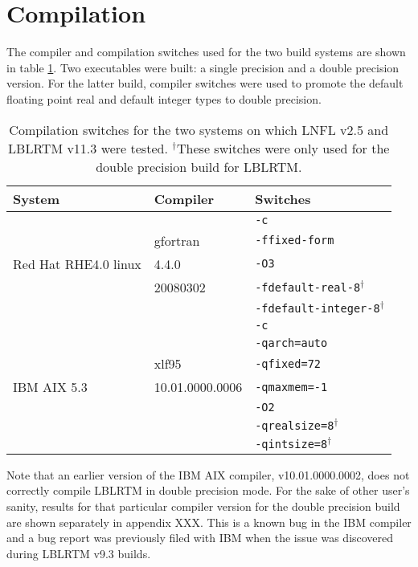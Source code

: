 \section{Compilation}
The compiler and compilation switches used for the two build systems are shown in table \ref{tab:lblrtm_compilation_switches}. Two executables were built: a single precision and a double precision version. For the latter build, compiler switches were used to promote the default floating point real and default integer types to double precision.

\begin{table}[htp]
  \centering
  \begin{tabular}{p{4cm} p{3cm} p{4cm}}
    \hline
    \sffamily\textbf{System} & \sffamily\textbf{Compiler} & \sffamily\textbf{Switches} \\
    \hline\hline
                         &          & \texttt{-c}\\
                         & gfortran & \texttt{-ffixed-form}\\
    Red Hat RHE4.0 linux & 4.4.0    & \texttt{-O3}\\
                         & 20080302 & \texttt{-fdefault-real-8}$^\dagger$\\
                         &          & \texttt{-fdefault-integer-8}$^\dagger$\\
    \hline
                         &                 & \texttt{-c}\\ 
                         &                 & \texttt{-qarch=auto}\\
                         & xlf95           & \texttt{-qfixed=72}\\
    IBM AIX 5.3          & 10.01.0000.0006 & \texttt{-qmaxmem=-1}\\
                         &                 & \texttt{-O2}\\
                         &                 & \texttt{-qrealsize=8}$^\dagger$\\
                         &                 & \texttt{-qintsize=8}$^\dagger$\\
    \hline
  \end{tabular}
  \caption{Compilation switches for the two systems on which LNFL v2.5 and LBLRTM v11.3 were tested. $^\dagger$These switches were only used for the double precision build for LBLRTM.}
  \label{tab:lblrtm_compilation_switches}
\end{table}

Note that an earlier version of the IBM AIX compiler, v10.01.0000.0002, does not correctly compile LBLRTM in double precision mode. For the sake of other user's sanity, results for that particular compiler version for the double precision build are shown separately in appendix XXX. This is a known bug in the IBM compiler and a bug report was previously filed with IBM when the issue was discovered during LBLRTM v9.3 builds.
